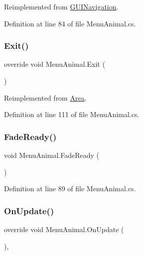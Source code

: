 Reimplemented from \mbox{\hyperlink{class_g_u_i_navigation_a98563f06446b45814ff78978b472e948}{G\+U\+I\+Navigation}}.



Definition at line 84 of file Menu\+Animal.\+cs.

\mbox{\label{class_menu_animal_af53d9975856687f698eccf7d45c83a24}} 
\subsubsection{\texorpdfstring{Exit()}{Exit()}}
{\footnotesize\ttfamily override void Menu\+Animal.\+Exit (\begin{DoxyParamCaption}{ }\end{DoxyParamCaption})\hspace{0.3cm}{\ttfamily [virtual]}}



Reimplemented from \mbox{\hyperlink{class_area_a96ef46550ca800c223f4db8f0b93e86b}{Area}}.



Definition at line 111 of file Menu\+Animal.\+cs.

\mbox{\label{class_menu_animal_afe23546cf23f5cf911e6f1655b9a5dbd}} 
\subsubsection{\texorpdfstring{Fade\+Ready()}{FadeReady()}}
{\footnotesize\ttfamily void Menu\+Animal.\+Fade\+Ready (\begin{DoxyParamCaption}{ }\end{DoxyParamCaption})}



Definition at line 89 of file Menu\+Animal.\+cs.

\mbox{\label{class_menu_animal_a896a3eaf9bf263688597a8652ac7469c}} 
\subsubsection{\texorpdfstring{On\+Update()}{OnUpdate()}}
{\footnotesize\ttfamily override void Menu\+Animal.\+On\+Update (\begin{DoxyParamCaption}{ }\end{DoxyParamCaption})\hspace{0.3cm}{\ttfamily [protected]}, {\ttfamily [virtual]}}



